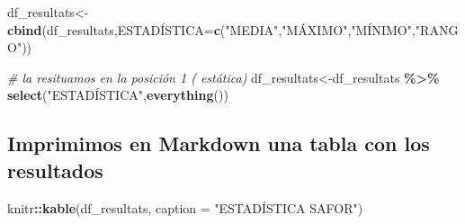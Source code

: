 \documentclass[
]{article}
\newenvironment{Shaded}{\begin{snugshade}}{\end{snugshade}}
\newcommand{\AttributeTok}[1]{\textcolor[rgb]{0.13,0.29,0.53}{#1}}
\newcommand{\CommentTok}[1]{\textcolor[rgb]{0.56,0.35,0.01}{\textit{#1}}}
\newcommand{\FunctionTok}[1]{\textcolor[rgb]{0.13,0.29,0.53}{\textbf{#1}}}
\newcommand{\NormalTok}[1]{#1}
\newcommand{\OtherTok}[1]{\textcolor[rgb]{0.56,0.35,0.01}{#1}}
\newcommand{\SpecialCharTok}[1]{\textcolor[rgb]{0.81,0.36,0.00}{\textbf{#1}}}
\newcommand{\StringTok}[1]{\textcolor[rgb]{0.31,0.60,0.02}{#1}}
\begin{document}
\begin{Shaded}
\begin{Highlighting}[]
\NormalTok{df\_resultats}\OtherTok{\textless{}{-}}\FunctionTok{cbind}\NormalTok{(df\_resultats,ESTADÍSTICA}\OtherTok{=}\FunctionTok{c}\NormalTok{(}\StringTok{"MEDIA"}\NormalTok{,}\StringTok{"MÁXIMO"}\NormalTok{,}\StringTok{"MÍNIMO"}\NormalTok{,}\StringTok{"RANGO"}\NormalTok{))}
\end{Highlighting}
\end{Shaded}

\begin{Shaded}
\begin{Highlighting}[]
\CommentTok{\# la resituamos en la posición 1 ( estática)}
\NormalTok{df\_resultats}\OtherTok{\textless{}{-}}\NormalTok{df\_resultats }\SpecialCharTok{\%\textgreater{}\%} \FunctionTok{select}\NormalTok{(}\StringTok{"ESTADÍSTICA"}\NormalTok{,}\FunctionTok{everything}\NormalTok{())}
\end{Highlighting}
\end{Shaded}

\hypertarget{imprimimos-en-markdown-una-tabla-con-los-resultados}{%
\subsection{Imprimimos en Markdown una tabla con los
resultados}\label{imprimimos-en-markdown-una-tabla-con-los-resultados}}

\begin{Shaded}
\begin{Highlighting}[]
\NormalTok{knitr}\SpecialCharTok{::}\FunctionTok{kable}\NormalTok{(df\_resultats, }\AttributeTok{caption =} \StringTok{"ESTADÍSTICA SAFOR"}\NormalTok{)}
\end{Highlighting}
\end{Shaded}
\end{document}
